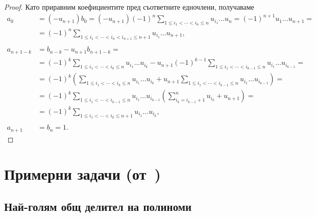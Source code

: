 \documentclass[numbers=endperiod, DIV=15]{scrartcl}
\begin{document}
\begin{proof}
  Като приравним коефициентите пред съответните едночлени, получаваме
  \begin{align*}
    a_0
    &=
    (-u_{n+1}) b_0
    =
    (-u_{n+1}) {(-1)}^n \sum_{1 \leq i_1 < \cdots < i_n \leq n} u_{i_1} \ldots u_n
    =
    {(-1)}^{n+1} u_1 \ldots u_{n+1}
    = \\ &=
    {(-1)}^n \sum_{1 \leq i_1 < \cdots < i_n < i_{n+1} \leq n + 1} u_{i_1} \ldots u_{n+1},
    \\ \\
    a_{n+1-k}
    &=
    b_{n-k} - u_{n+1} b_{n+1-k}
    = \\ &=
    {(-1)}^k \sum_{1 \leq i_1 < \cdots < i_k \leq n} u_{i_1} \ldots u_{i_k} - u_{n+1} {(-1)}^{k-1} \sum_{1 \leq i_1 < \cdots < i_{k-1} \leq n} u_{i_1} \ldots u_{i_{k-1}}
    = \\ &=
    {(-1)}^k \left( \sum_{1 \leq i_1 < \cdots < i_k \leq n} u_{i_1} \ldots u_{i_k} + u_{n+1} \sum_{1 \leq i_1 < \cdots < i_{k-1} \leq n} u_{i_1} \ldots u_{i_{k-1}} \right)
    = \\ &=
    {(-1)}^k \sum_{1 \leq i_1 < \cdots < i_{k-1} \leq n} u_{i_1} \ldots u_{i_{k-1}} \left(\sum_{i_k=i_{k-1}+1}^n u_{i_k} + u_{n+1} \right)
    = \\ &=
    {(-1)}^k \sum_{1 \leq i_1 < \cdots < i_k \leq n + 1} u_{i_1} \ldots u_{i_k},
    \\ \\
    a_{n+1} &= b_n = 1.
  \end{align*}
\end{proof}

\section{Примерни задачи (от~\cite{PolynomialExercises})}

\subsection{Най-голям общ делител на полиноми}
\end{document}
